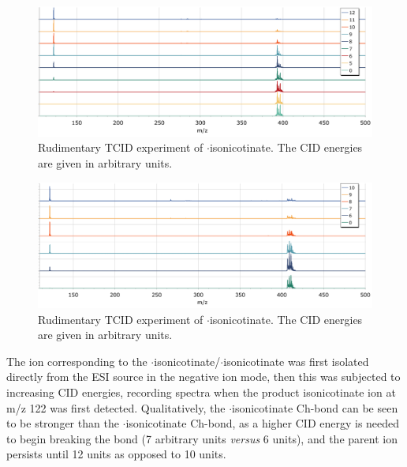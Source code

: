\begin{refsection}
\begin{figure}
    \centering
    \includegraphics[width=\linewidth]{Figures/ebs-ph-cid.pdf}
    \caption[TCID experiment of $ \cdot $isonicotinate.]{Rudimentary TCID experiment of $ \cdot $isonicotinate. The CID energies are given in arbitrary units.}\label{fig:ebs-ph-tcid}
\end{figure}

\begin{figure}
  \centering
  \includegraphics[width=\linewidth]{Figures/ebs-bn-cid.pdf}
  \caption[TCID experiment of $ \cdot $isonicotinate.]{Rudimentary TCID experiment of $ \cdot $isonicotinate. The CID energies are given in arbitrary units.}\label{fig:ebs-bn-tcid}
\end{figure}

The ion corresponding to the $ \cdot $isonicotinate/$ \cdot $isonicotinate was first isolated directly from the ESI source in the negative ion mode, then this was subjected to increasing CID energies, recording spectra when the product isonicotinate ion at m/z 122 was first detected.
Qualitatively, the $ \cdot $isonicotinate Ch-bond can be seen to be stronger than the $ \cdot $isonicotinate Ch-bond, as a higher CID energy is needed to begin breaking the bond (7 arbitrary units \emph{versus} 6 units), and the parent ion persists until 12 units as opposed to 10 units.


\end{refsection}

